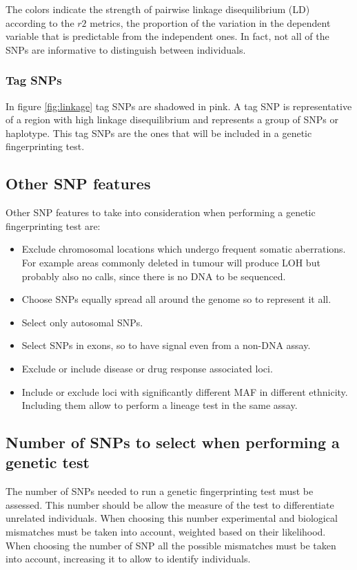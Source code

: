 		The colors indicate the strength of pairwise linkage disequilibrium (LD) according to the $r2$ metrics, the proportion of the variation in the dependent variable that is predictable from the independent ones.
		In fact, not all of the SNPs are informative to distinguish between individuals.

		\subsubsection{Tag SNPs}
		In figure \ref{fig:linkage} tag SNPs are shadowed in pink.
		A tag SNP is representative of a region with high linkage disequilibrium and represents a group of SNPs or haplotype.
		This tag SNPs are the ones that will be included in a genetic fingerprinting test.

	\subsection{Other SNP features}
	Other SNP features to take into consideration when performing a genetic fingerprinting test are:

	\begin{multicols}{2}
		\begin{itemize}
			\item Exclude chromosomal locations which undergo frequent somatic aberrations.
				For example areas commonly deleted in tumour will produce LOH but probably also no calls, since there is no DNA to be sequenced.
			\item Choose SNPs equally spread all around the genome so to represent it all.
			\item Select only autosomal SNPs.
			\item Select SNPs in exons, so to have signal even from a non-DNA assay.
			\item Exclude or include disease or drug response associated loci.
			\item Include or exclude loci with significantly different MAF in different ethnicity.
				Including them allow to perform a lineage test in the same assay.
		\end{itemize}
	\end{multicols}

	\subsection{Number of SNPs to select when performing a genetic test}
	The number of SNPs needed to run a genetic fingerprinting test must be assessed.
	This number should be allow the measure of the test to differentiate unrelated individuals.
	When choosing this number experimental and biological mismatches must be taken into account, weighted based on their likelihood.
	When choosing the number of SNP all the possible mismatches must be taken into account, increasing it to allow to identify individuals.

